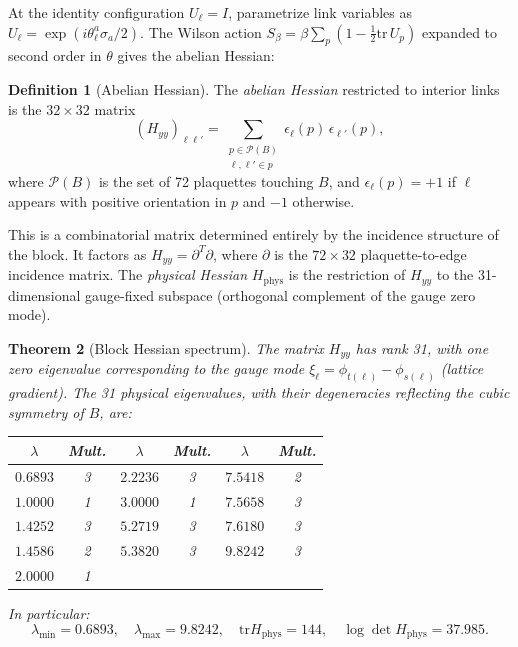 \documentclass[11pt]{article}
\newtheorem{theorem}{Theorem}[section]
\theoremstyle{definition}
\newtheorem{definition}[theorem]{Definition}
\newcommand{\tr}{\mathrm{tr}}
\begin{document}
At the identity configuration $U_\ell=I$, parametrize link variables as
$U_\ell=\exp(i\theta_\ell^a\sigma_a/2)$.  The Wilson action
$S_\beta=\beta\sum_p(1-\frac{1}{2}\tr\,U_p)$ expanded to second order
in $\theta$ gives the abelian Hessian:

\begin{definition}[Abelian Hessian]\label{def:Hyy}
The \emph{abelian Hessian} restricted to interior links is the
$32\times 32$ matrix
\begin{equation}\label{eq:Hyy}
(H_{yy})_{\ell\ell'}
=\sum_{\substack{p\in\mathcal{P}(B)\\\ell,\ell'\in p}}
\epsilon_\ell(p)\,\epsilon_{\ell'}(p),
\end{equation}
where $\mathcal{P}(B)$ is the set of 72 plaquettes touching $B$, and
$\epsilon_\ell(p)=+1$ if $\ell$ appears with positive orientation in
$p$ and $-1$ otherwise.
\end{definition}

This is a combinatorial matrix determined entirely by the incidence
structure of the block.  It factors as $H_{yy}=\partial^T\partial$,
where $\partial$ is the $72\times 32$ plaquette-to-edge incidence
matrix.  The \emph{physical Hessian}
$H_{\mathrm{phys}}$ is the restriction of $H_{yy}$ to the
31-dimensional gauge-fixed subspace (orthogonal complement of the
gauge zero mode).

\begin{theorem}[Block Hessian spectrum]\label{thm:spectrum}
The matrix $H_{yy}$ has rank 31, with one zero eigenvalue corresponding
to the gauge mode $\xi_\ell=\phi_{t(\ell)}-\phi_{s(\ell)}$ (lattice
gradient).  The 31 physical eigenvalues, with their degeneracies
reflecting the cubic symmetry of $B$, are:

\begin{center}
\begin{tabular}{cccccc}
\toprule
$\lambda$ & Mult. & $\lambda$ & Mult. & $\lambda$ & Mult.\\
\midrule
$0.6893$ & 3 & $2.2236$ & 3 & $7.5418$ & 2\\
$1.0000$ & 1 & $3.0000$ & 1 & $7.5658$ & 3\\
$1.4252$ & 3 & $5.2719$ & 3 & $7.6180$ & 3\\
$1.4586$ & 2 & $5.3820$ & 3 & $9.8242$ & 3\\
$2.0000$ & 1 & & & &\\
\bottomrule
\end{tabular}
\end{center}

\noindent In particular:
\begin{equation}\label{eq:spectraldata}
\lambda_{\min}=0.6893,\quad
\lambda_{\max}=9.8242,\quad
\tr H_{\mathrm{phys}}=144,\quad
\log\det H_{\mathrm{phys}}=37.985.
\end{equation}
\end{theorem}
\end{document}
